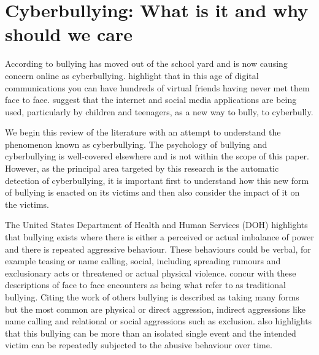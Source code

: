 \section{Cyberbullying: What is it and why should we care}
\label{section:3.1}

According to \citet{nahar_step_2013} bullying has moved out of the school yard and is now causing concern online as cyberbullying. \citet{dadvar_improved_2012} highlight that in this age of digital communications you can have hundreds of virtual friends having never met them face to face. \citet{kontostathis_detecting_2013} suggest that the internet and social media applications are being used, particularly by children and teenagers, as a new way to bully, to cyberbully.
 
We begin this review of the literature with an attempt to understand the phenomenon known as cyberbullying. The psychology of bullying and cyberbullying is well-covered elsewhere and is not within the scope of this paper. However, as the principal area targeted by this research is the automatic detection of cyberbullying, it is important first to understand how this new form of bullying is enacted on its victims and then also consider the impact of it on the victims.

The United States Department of Health and Human Services (DOH) \cite{DOH} highlights that bullying exists where there is either a perceived or actual imbalance of power and there is repeated aggressive behaviour. These behaviours could be verbal, for example teasing or name calling, social, including spreading rumours and exclusionary acts or threatened or actual physical violence. \citet{xu_fast_2012} concur with these descriptions of face to face encounters as being what \citet{dadvar_improved_2012} refer to as traditional bullying. Citing the work of others \cite{archer_integrated_2005} \cite{little_disentangling_2003} \cite{nylund_subtypes_2007} bullying is described as taking many forms but the most common are physical or direct aggression, indirect aggressions like name calling and relational or social aggressions such as exclusion. \citet{xu_fast_2012} also highlights that this bullying can be more than an isolated single event and the intended victim can be repeatedly subjected to the abusive behaviour over time.

